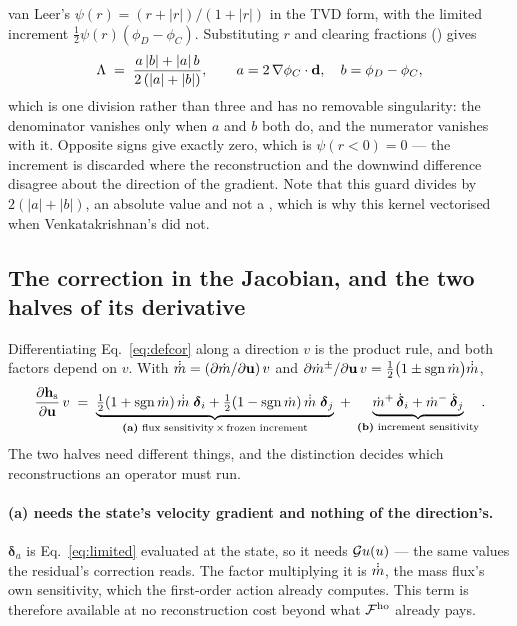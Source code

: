 van Leer's $\psi(r) = (r + |r|)/(1 + |r|)$ in the TVD form, with the limited increment
$\tfrac12\psi(r)(\phi_D - \phi_C)$. Substituting $r$ and clearing fractions
() gives
\begin{equation}
\Lambda \;=\; \frac{a\,|b| + |a|\,b}{2\,(|a| + |b|)},
\qquad a = 2\,\nabla\phi_C\cdot\mathbf{d}, \quad b = \phi_D - \phi_C ,
\label{eq:dm}
\end{equation}
which is one division rather than three and has no removable singularity: the denominator vanishes
only when $a$ and $b$ both do, and the numerator vanishes with it. Opposite signs give exactly
zero, which is $\psi(r<0) = 0$ --- the increment is discarded where the reconstruction and the
downwind difference disagree about the direction of the gradient. Note that this guard divides by
$2(|a|+|b|)$, an absolute value and not a , which is why this kernel vectorised
when Venkatakrishnan's did not.

\subsection{The correction in the Jacobian, and the two halves of its derivative}
\label{sec:jac:defcor}

Differentiating Eq.~\eqref{eq:defcor} along a direction $v$ is the product rule, and both factors
depend on $v$. With $\dot{\dot{m}} = (\partial\dot{m}/\partial\mathbf{u})\,v$ and
$\partial\dot{m}^{\pm}/\partial\mathbf{u}\,v = \tfrac12\bigl(1 \pm \operatorname{sgn}\dot{m}\bigr)\dot{\dot{m}}$,
\begin{equation}
\frac{\partial\mathbf{h}_{\mathrm{s}}}{\partial\mathbf{u}}\,v
\;=\;
\underbrace{\tfrac12(1+\operatorname{sgn}\dot{m})\,\dot{\dot{m}}\;\boldsymbol{\delta}_i
          + \tfrac12(1-\operatorname{sgn}\dot{m})\,\dot{\dot{m}}\;\boldsymbol{\delta}_j}_{\textbf{(a)}
          \text{ flux sensitivity} \,\times\, \text{frozen increment}}
\;+\;
\underbrace{\dot{m}^{+}\,\dot{\boldsymbol{\delta}}_i + \dot{m}^{-}\,\dot{\boldsymbol{\delta}}_j}_{\textbf{(b)}
          \text{ increment sensitivity}} .
\label{eq:defcor-jv}
\end{equation}
The two halves need different things, and the distinction decides which reconstructions an
operator must run.

\paragraph{(a) needs the state's velocity gradient and nothing of the direction's.}
$\boldsymbol{\delta}_a$ is Eq.~\eqref{eq:limited} evaluated at the state, so it needs
$\mathcal{G} u(u)$ --- the same values the residual's correction reads. The factor multiplying it is
$\dot{\dot{m}}$, the mass flux's own sensitivity, which the first-order action already computes.
This term is therefore available at no reconstruction cost beyond what $\mathcal{F}^{\mathrm{ho}}$ already pays.

